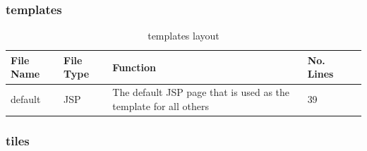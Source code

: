\subsubsection{templates}
\begin{table}[H]
\begin{center}
\begin{tabular}{| l | l | l| l |p{1cm} |}
    \hline
    File Name & File Type & Function & No. Lines\\ \hline
	default & JSP & The default JSP page that is used as the template for all others & 39\\ \hline	
    \end{tabular}
\end{center}
\caption{templates layout}
\end{table}

\subsubsection{tiles}
